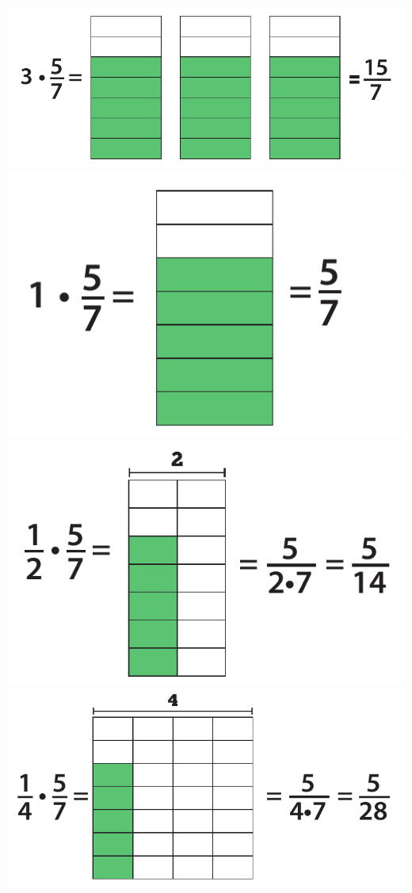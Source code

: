 \includegraphics[scale=0.4]{pictures/Kuva3-1-1.pdf}
\includegraphics[scale=0.4]{pictures/Kuva3-1-2.pdf}
\includegraphics[scale=0.4]{pictures/Kuva3-1-3.pdf}
\includegraphics[scale=0.4]{pictures/Kuva3-1-4.pdf}
